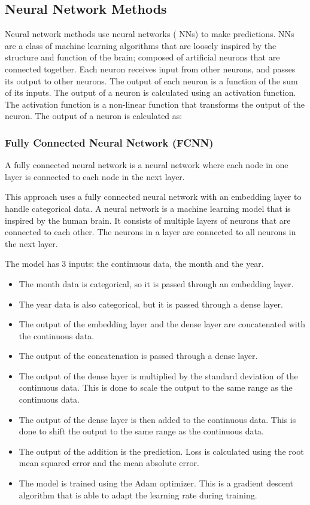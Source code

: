 \documentclass[manuscript,screen,nonacm]{acmart}
\numberwithin{equation}{section}
\begin{document}
\subsection{Neural Network Methods}
Neural network methods use neural networks ( NNs) to make predictions. 
NNs are a class of machine learning algorithms that are loosely inspired by the structure and function of the brain; composed of artificial neurons that are connected together. Each neuron receives input from other neurons, and passes its output to other neurons. The output of each neuron is a function of the sum of its inputs. The output of a neuron is calculated using an activation function. The activation function is a non-linear function that transforms the output of the neuron. The output of a neuron is calculated as:


\subsubsection{Fully Connected Neural Network (FCNN)}
A fully connected neural network is a neural network where each node in one
    layer is connected to each node in the next layer.

	This approach uses a fully connected neural network with an embedding layer 
	to handle categorical data.
	A neural network is a machine learning model that is inspired by the human brain.
	It consists of multiple layers of neurons that are connected to each other.
	The neurons in a layer are connected to all neurons in the next layer.
	
	The model has 3 inputs: the continuous data, the month and the year.
	\begin{itemize}
		\item The month data is categorical, so it is passed through an embedding layer.
		\item The year data is also categorical, but it is passed through a dense layer.
		\item The output of the embedding layer and the dense layer are concatenated with the continuous data.
		\item The output of the concatenation is passed through a dense layer.
		\item The output of the dense layer is multiplied by the standard deviation of the continuous data. 
		This is done to scale the output to the same range as the continuous data.
		\item The output of the dense layer is then added to the continuous data. This is done to shift 
		the output to the same range as the continuous data.
		\item The output of the addition is the prediction.
		Loss is calculated using the root mean squared error and the mean absolute error.
		\item The model is trained using the Adam optimizer. This is a gradient descent algorithm that
		is able to adapt the learning rate during training.
	\end{itemize}
\end{document}
